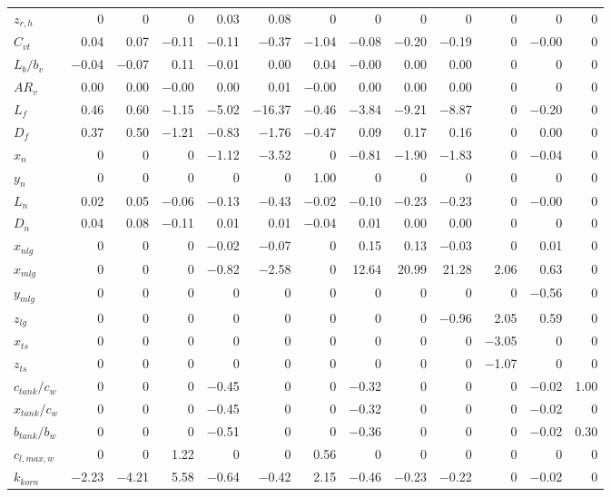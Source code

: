 \begin{longtable}{l|rrrrrrrrrrrr}
$z_{r,h}$ & 0 & 0 & 0 & 0.03 & 0.08 & 0 & 0 & 0 & 0 & 0 & 0 & 0 \\
$C_{vt}$ & 0.04 & 0.07 & $-$0.11 & $-$0.11 & $-$0.37 & $-$1.04 & $-$0.08 & $-$0.20 & $-$0.19 & 0 & $-$0.00 & 0 \\
$L_b/b_v$ & $-$0.04 & $-$0.07 & 0.11 & $-$0.01 & 0.00 & 0.04 & $-$0.00 & 0.00 & 0.00 & 0 & 0 & 0 \\
$AR_v$ & 0.00 & 0.00 & $-$0.00 & 0.00 & 0.01 & $-$0.00 & 0.00 & 0.00 & 0.00 & 0 & 0 & 0 \\
$L_f$ & 0.46 & 0.60 & $-$1.15 & $-$5.02 & $-$16.37 & $-$0.46 & $-$3.84 & $-$9.21 & $-$8.87 & 0 & $-$0.20 & 0 \\
$D_f$ & 0.37 & 0.50 & $-$1.21 & $-$0.83 & $-$1.76 & $-$0.47 & 0.09 & 0.17 & 0.16 & 0 & 0.00 & 0 \\
$x_n$ & 0 & 0 & 0 & $-$1.12 & $-$3.52 & 0 & $-$0.81 & $-$1.90 & $-$1.83 & 0 & $-$0.04 & 0 \\
$y_n$ & 0 & 0 & 0 & 0 & 0 & 1.00 & 0 & 0 & 0 & 0 & 0 & 0 \\
$L_n$ & 0.02 & 0.05 & $-$0.06 & $-$0.13 & $-$0.43 & $-$0.02 & $-$0.10 & $-$0.23 & $-$0.23 & 0 & $-$0.00 & 0 \\
$D_n$ & 0.04 & 0.08 & $-$0.11 & 0.01 & 0.01 & $-$0.04 & 0.01 & 0.00 & 0.00 & 0 & 0 & 0 \\
$x_{nlg}$ & 0 & 0 & 0 & $-$0.02 & $-$0.07 & 0 & 0.15 & 0.13 & $-$0.03 & 0 & 0.01 & 0 \\
$x_{mlg}$ & 0 & 0 & 0 & $-$0.82 & $-$2.58 & 0 & 12.64 & 20.99 & 21.28 & 2.06 & 0.63 & 0 \\
$y_{mlg}$ & 0 & 0 & 0 & 0 & 0 & 0 & 0 & 0 & 0 & 0 & $-$0.56 & 0 \\
$z_{lg}$ & 0 & 0 & 0 & 0 & 0 & 0 & 0 & 0 & $-$0.96 & 2.05 & 0.59 & 0 \\
$x_{ts}$ & 0 & 0 & 0 & 0 & 0 & 0 & 0 & 0 & 0 & $-$3.05 & 0 & 0 \\
$z_{ts}$ & 0 & 0 & 0 & 0 & 0 & 0 & 0 & 0 & 0 & $-$1.07 & 0 & 0 \\
$c_{tank}/c_w$ & 0 & 0 & 0 & $-$0.45 & 0 & 0 & $-$0.32 & 0 & 0 & 0 & $-$0.02 & 1.00 \\
$x_{tank}/c_w$ & 0 & 0 & 0 & $-$0.45 & 0 & 0 & $-$0.32 & 0 & 0 & 0 & $-$0.02 & 0 \\
$b_{tank}/b_w$ & 0 & 0 & 0 & $-$0.51 & 0 & 0 & $-$0.36 & 0 & 0 & 0 & $-$0.02 & 0.30 \\
$c_{l,max,w}$ & 0 & 0 & 1.22 & 0 & 0 & 0.56 & 0 & 0 & 0 & 0 & 0 & 0 \\
$k_{korn}$ & $-$2.23 & $-$4.21 & 5.58 & $-$0.64 & $-$0.42 & 2.15 & $-$0.46 & $-$0.23 & $-$0.22 & 0 & $-$0.02 & 0 \\

\end{longtable}
